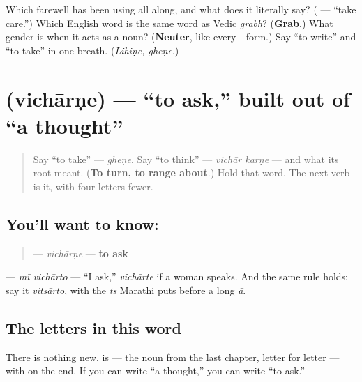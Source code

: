 \begin{tcolorbox}[breakable,colback=teal!4,colframe=teal!35!black,title={Before you move on}]
Which farewell has been using \textbf{} all along, and what does it literally say? (\textbf{ } — \textquotedblleft{}take care.\textquotedblright{}) Which English word is the same word as Vedic \emph{grabh}? (\textbf{Grab}.) What gender is \textbf{} when it acts as a noun? (\textbf{Neuter}, like every \emph{-} form.) Say \textquotedblleft{}to write\textquotedblright{} and \textquotedblleft{}to take\textquotedblright{} in one breath. (\emph{Lihiṇe, gheṇe}.)
\end{tcolorbox}
\section[vichārṇe]{ (vichārṇe) — \textquotedblleft{}to ask,\textquotedblright{} built out of \textquotedblleft{}a thought\textquotedblright{}}

\label{lesson:MR-C09-vicharne}



\begin{quote}
Say \textquotedblleft{}to take\textquotedblright{} — \emph{gheṇe}. Say \textquotedblleft{}to think\textquotedblright{} — \emph{vichār karṇe} — and what its root meant. (\textbf{To turn, to range about}.) Hold that word. The next verb is it, with four letters fewer.
\end{quote}

\subsection*{You'll want to know: }
\begin{quote}
\textbf{} — \emph{vichārṇe} — \textbf{to ask}
\end{quote}

\textbf{ } — \emph{mī vichārto} — \textquotedblleft{}I ask,\textquotedblright{} \textbf{} \emph{vichārte} if a woman speaks. And the same \textbf{} rule holds: say it \emph{vitsārto}, with the \emph{ts} Marathi puts before a long \emph{ā}.

\subsection*{The letters in this word}
There is nothing new. \textbf{} is \textbf{} — the noun from the last chapter, letter for letter — with \textbf{} on the end. If you can write \textquotedblleft{}a thought,\textquotedblright{} you can write \textquotedblleft{}to ask.\textquotedblright{}


